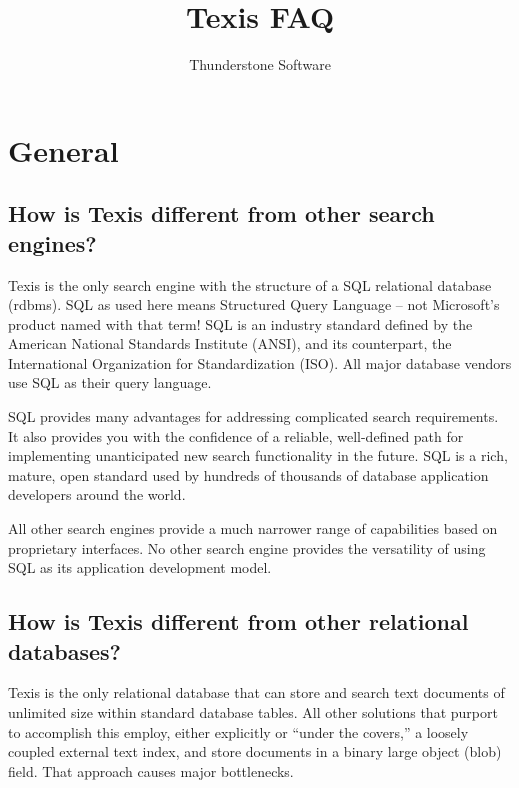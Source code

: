
\title{Texis FAQ}
\author{Thunderstone Software}



\maketitle

\tableofcontents

\chapter{General}

\section{How is Texis different from other search engines? }
Texis is the only search engine with the structure of a SQL
relational database (rdbms). SQL as used here means Structured Query
Language -- not Microsoft's product named with that term!  SQL is an
industry standard defined by the American National Standards Institute
(ANSI), and its counterpart, the International Organization for
Standardization (ISO). All major database vendors use SQL as their
query language.

SQL provides many advantages for addressing complicated search
requirements. It also provides you with the confidence of a reliable,
well-defined path for implementing unanticipated new search
functionality in the future.  SQL is a rich, mature, open standard used
by hundreds of thousands of database application developers around the
world.

All other search engines provide a much narrower range of capabilities
based on proprietary interfaces. No other search engine provides the
versatility of using SQL as its application development model.

\section{How is Texis different from other relational databases? }
Texis is the only relational database that can store and search text
documents of unlimited size within standard database tables. All other
solutions that purport to accomplish this employ, either explicitly or
``under the covers,'' a loosely coupled external text index, and store
documents in a binary large object (blob) field. That approach causes
major bottlenecks.

